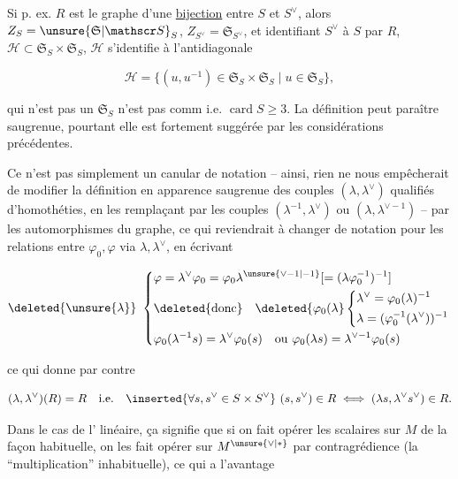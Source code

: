 Si p. ex. $R$ est le graphe d'une \uline{bijection} entre $S$ et $S^\vee$, alors  $Z_S=\unsure{\mathfrak S|\mathscr S}_S$, $Z_{S^\vee}=\mathfrak S_{S^\vee}$, et identifiant $S^\vee$ à $S$ par $R$,  $\mathcal H\subset\mathfrak S_S\times\mathfrak S_S$, $\mathcal H$ s'identifie à l'antidiagonale

\[
\mathcal H=\{(u,u^{-1})\in\mathfrak S_S\times\mathfrak S_S\mid u\in\mathfrak S_S\}, \tag*{(}
\]

qui n'est pas un    $\mathfrak S_S$ n'est pas comm i.e. $\operatorname{card}S\ge3$. La définition  peut paraître saugrenue, pourtant elle est fortement suggérée par les considérations précédentes.

Ce n'est pas simplement un canular de notation -- ainsi, rien ne nous empêcherait de modifier la définition en apparence saugrenue des couples $(\lambda,\lambda^\vee)$ qualifiés d'homothéties, en les remplaçant par les couples $(\lambda^{-1},\lambda^\vee)$ ou $(\lambda,\lambda^{\vee-1})$ -- par les automorphismes du graphe, ce qui reviendrait à changer de notation pour les relations entre $\varphi_0,\varphi$ via $\lambda,\lambda^\vee$, en écrivant

\[
\deleted{\unsure{\lambda}}\
\left\{\begin{aligned}
&\varphi=\lambda^\vee\varphi_0=\varphi_0\lambda^{\unsure{\vee-1|-1}}
[=(\lambda\varphi_0^{-1})^{-1}]\\
&\deleted{\text{donc}}\quad\deleted{\varphi_0(\lambda}
\left\{\begin{aligned}&\lambda^\vee=\varphi_0(\lambda)^{-1}\\&\lambda=(\varphi_0^{-1}(\lambda^\vee))^{-1}\end{aligned}\right.\\
&\varphi_0(\lambda^{-1}s)=\lambda^\vee\varphi_0(s)\quad\text{ou }\varphi_0(\lambda s)=\lambda^{\vee-1}\varphi_0(s)
\end{aligned}\right.
\]


ce qui donne par contre

\[
(\lambda,\lambda^\vee)(R)=R\quad\text{i.e.}\quad
\inserted{\forall s,s^\vee\in S\times S^\vee}\ (s,s^\vee)\in R\iff(\lambda s,\lambda^\vee s^\vee)\in R.
\]

Dans le cas de l' linéaire, ça signifie que si on fait opérer les scalaires \inserted{$\in\Lambda^*$} sur $M$ de la façon habituelle, on les fait opérer sur $M^{\unsure{\vee|*}}$ par contragrédience (la ``multiplication'' inhabituelle), ce qui a l'avantage

